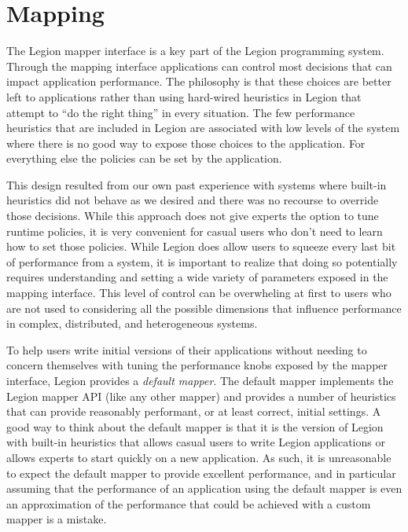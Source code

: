 \chapter{Mapping}
\label{chap:mapping}
The Legion mapper interface is a key part
of the Legion programming system. Through the mapping interface applications
can control most decisions that can impact application performance.
The philosophy is that these choices are better left to applications
rather than using hard-wired heuristics in Legion that attempt to ``do the right thing'' in
every situation.  The few performance heuristics
that are included in Legion are associated with low levels of the system
where there is no good way to expose those choices to the application.
For everything else the policies can be set by the application.

This design resulted from our own past experience with systems
where built-in heuristics did not behave as we desired and there was no recourse
to override those decisions.  While this approach does not give experts the
option to tune runtime policies, it is very convenient for casual users
who don't need to learn how to set those policies. While Legion does allow
users to squeeze every last bit of performance from a system, it is important
to realize that doing so potentially requires understanding and setting a wide
variety of parameters exposed in the mapping interface.
This level of control can be overwheling at first to users who are not used to
considering all the possible dimensions that influence performance in complex,
distributed, and heterogeneous systems.

To help users write initial versions of their applications without needing
to concern themselves with tuning the performance knobs exposed by the mapper
interface, Legion provides a {\em default mapper}.  The default mapper
implements the Legion mapper API (like any other mapper) and provides a number
of heuristics that can provide reasonably performant, or at least correct, initial
settings.  A good way to think about the default mapper is that it is the version
of Legion with built-in heuristics that allows casual users to write Legion
applications or allows experts to start quickly on a new application.
As such, it is unreasonable to expect the default mapper to provide excellent performance, and in
particular assuming that the performance of an application using the default
mapper is even an approximation of the performance that could be
achieved with a custom mapper is a mistake.


